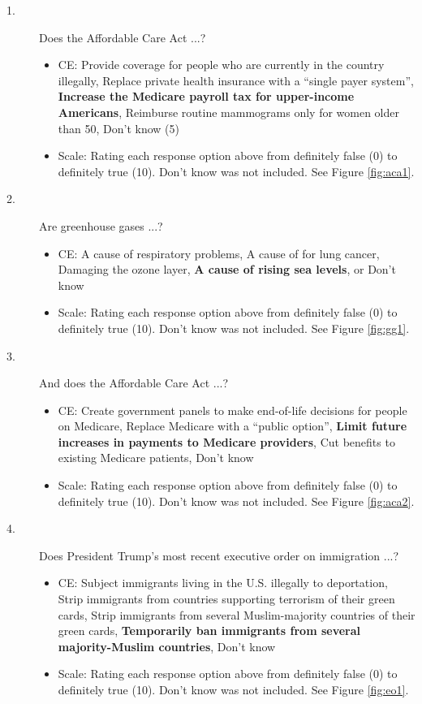 \begin{description}
\item[1.] Does the Affordable Care Act ...?
  \begin{itemize}
    \item  CE: Provide coverage for people who are currently in the country illegally, Replace private health insurance with a ``single payer system'', \textbf{Increase the Medicare payroll tax for upper-income Americans}, Reimburse routine mammograms only for women older than 50, Don’t know (5)
    \item  Scale: Rating each response option above from definitely false (0) to definitely true (10). Don’t know was not included. See Figure \ref{fig:aca1}.
    \end{itemize}
    \item[2.] Are greenhouse gases ...?
  \begin{itemize}
  \item CE: A cause of respiratory problems, A cause of for lung cancer, Damaging the ozone layer, \textbf{A cause of rising sea levels}, or Don’t know
  \item Scale: Rating each response option above from definitely false (0) to definitely true (10). Don’t know was not included. See Figure \ref{fig:gg1}.
    \end{itemize}
  \item[3.] And does the Affordable Care Act ...?
    \begin{itemize}
  \item CE: Create government panels to make end-of-life decisions for people on Medicare, Replace Medicare with a ``public option'', \textbf{Limit future increases in payments to Medicare providers}, Cut benefits to existing Medicare patients, Don’t know
  \item Scale: Rating each response option above from definitely false (0) to definitely true (10). Don’t know was not included. See Figure \ref{fig:aca2}.
    \end{itemize}
        \item[4.] Does President Trump’s most recent executive order on immigration ...?
  \begin{itemize}
  \item  CE: Subject immigrants living in the U.S. illegally to deportation, Strip immigrants from countries supporting terrorism of their green cards, Strip immigrants from several Muslim-majority countries of their green cards, \textbf{Temporarily ban immigrants from several majority-Muslim countries}, Don’t know
    \item  Scale: Rating each response option above from definitely false (0) to definitely true (10). Don’t know was not included. See Figure \ref{fig:eo1}.
    \end{itemize}
    \end{description}

